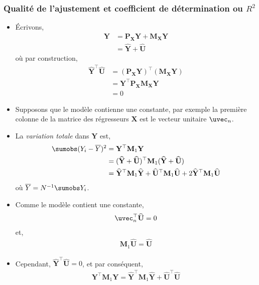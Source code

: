 \begin{frame}[allowframebreaks]\frametitle{Qualité de l'ajustement et coefficient de détermination ou $R^2$}
\begin{itemize}
\item \'Ecrivons,
\begin{align*}
\mathbf{Y} &= \mathbf{P}_\mathbf{X}\mathbf{Y}+ \mathbf{M}_\mathbf{X}\mathbf{Y}\\
&=\widehat{\mathbf{Y}}+\widehat{\mathbf{U}}
\end{align*}
où par construction,
\begin{align*}
\widehat{\mathbf{Y}}^\top\widehat{\mathbf{U}} &= (\mathbf{P}_\mathbf{X}\mathbf{Y})^\top (\mathbf{M}_\mathbf{X}\mathbf{Y})\\ 
&= \mathbf{Y}^\top  \mathbf{P}_\mathbf{X} \mathbf{M}_\mathbf{X}\mathbf{Y}\\
& = 0
\end{align*}
\item Supposons que le modèle contienne une constante, par exemple la première colonne de la matrice des régresseurs $\mathbf{X}$ est le vecteur unitaire $\uvec_n$.
\item  La \emph{variation totale} dans $\mathbf{Y}$ est,
\begin{align*}
\sumobs(Y_i - \overline{Y})^2 &= \mathbf{Y}^\top\mathbf{M}_1\mathbf{Y}\\
&=(\widehat{\mathbf{Y}}  + \widehat{\mathbf{U}} )^\top\mathbf{M}_1(\widehat{\mathbf{Y}}  + \widehat{\mathbf{U}} )\\
&=\widehat{\mathbf{Y}}^\top\mathbf{M}_1\widehat{\mathbf{Y}} + \widehat{\mathbf{U}}^\top\mathbf{M}_1\widehat{\mathbf{U}} + 2\widehat{\mathbf{Y}}^\top\mathbf{M}_1\widehat{\mathbf{U}}
\end{align*}
où $\overline{Y} = N^{-1}\sumobs Y_i$.
\item  Comme le modèle contient une constante,
\begin{align*}
\uvec_n^\top\widehat{\mathbf{U}} = 0
\end{align*}
et,
\begin{align*}
\mathbf{M}_1\widehat{\mathbf{U}} =\widehat{\mathbf{U}}  
\end{align*}
\item Cependant, $\widehat{\mathbf{Y}}^\top \widehat{\mathbf{U}} =0$, et par conséquent,
\begin{align*}
\mathbf{Y}^\top\mathbf{M}_1\mathbf{Y} = \widehat{\mathbf{Y}}^\top\mathbf{M}_1\widehat{\mathbf{Y}} +
\widehat{\mathbf{U}}^\top\widehat{\mathbf{U}} 
\end{align*}

\end{itemize}
\end{frame}
